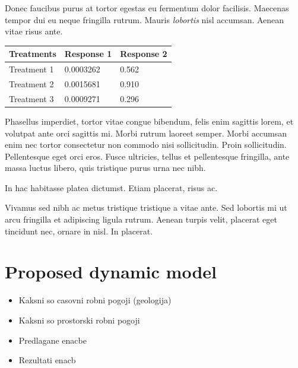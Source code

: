 \documentclass[a0,portrait]{a0poster}
\begin{document}
\begin{multicols}{2}
Donec faucibus purus at tortor egestas eu fermentum dolor facilisis. Maecenas tempor dui eu neque fringilla rutrum. Mauris \emph{lobortis} nisl accumsan. Aenean vitae risus ante.
%
\begin{table} %
\begin{tabular}{l l l}
\toprule
\textbf{Treatments} & \textbf{Response 1} & \textbf{Response 2}\\
\midrule
Treatment 1 & 0.0003262 & 0.562 \\
Treatment 2 & 0.0015681 & 0.910 \\
Treatment 3 & 0.0009271 & 0.296 \\
\bottomrule
\end{tabular}
\end{table}
%
Phasellus imperdiet, tortor vitae congue bibendum, felis enim sagittis lorem, et volutpat ante orci sagittis mi. Morbi rutrum laoreet semper. Morbi accumsan enim nec tortor consectetur non commodo nisi sollicitudin. Proin sollicitudin. Pellentesque eget orci eros. Fusce ultricies, tellus et pellentesque fringilla, ante massa luctus libero, quis tristique purus urna nec nibh.

In hac habitasse platea dictumst. Etiam placerat, risus ac.

Vivamus sed nibh ac metus tristique tristique a vitae ante. Sed lobortis mi ut arcu fringilla et adipiscing ligula rutrum. Aenean turpis velit, placerat eget tincidunt nec, ornare in nisl. In placerat.


\color{SaddleBrown} %

\section*{Proposed dynamic model}

\begin{itemize}
	\item Kaksni so casovni robni pogoji (geologija)
	\item Kaksni so prostorski robni pogoji
	\item Predlagane enacbe
	\item Rezultati enacb
\end{itemize}


\end{multicols}
\end{document}
